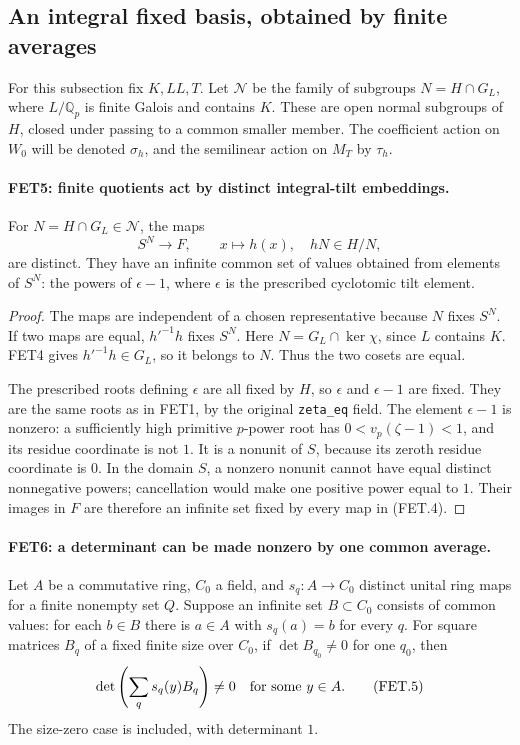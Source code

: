 \subsection{An integral fixed basis, obtained by finite averages}

For this subsection fix $K,LL,T$. Let $\mathcal N$ be the family
of subgroups $N=H\cap G_L$, where $L/\mathbb Q_p$ is finite
Galois and contains $K$. These are open normal subgroups of $H$,
closed under passing to a common smaller member. The coefficient
action on $W_0$ will be denoted $\sigma_h$, and the semilinear
action on $M_T$ by $\tau_h$.

\paragraph{FET5: finite quotients act by distinct integral-tilt embeddings.}
\label{claim:FET5}
For $N=H\cap G_L\in\mathcal N$, the maps
\[
 S^N\longrightarrow F,\qquad x\longmapsto h(x),
                   \quad hN\in H/N,                      \tag{FET.4}
\]
are distinct. They have an infinite common set of values obtained
from elements of $S^N$: the powers of $\epsilon-1$, where
$\epsilon$ is the prescribed cyclotomic tilt element.

\begin{proof}
The maps are independent of a chosen representative because $N$
fixes $S^N$. If two maps are equal, $h'^{-1}h$ fixes $S^N$.
Here $N=G_L\cap\ker\chi$, since $L$ contains $K$.
FET4 gives $h'^{-1}h\in G_L$, so it belongs to $N$.
Thus the two cosets are equal.

The prescribed roots defining $\epsilon$ are all fixed by $H$,
so $\epsilon$ and $\epsilon-1$ are fixed. They are the same roots
as in FET1, by the original \texttt{zeta\_eq} field.
The element $\epsilon-1$ is nonzero: a sufficiently high primitive
$p$-power root has $0<v_p(\zeta-1)<1$, and its residue coordinate
is not $1$. It is a nonunit of $S$, because its zeroth residue
coordinate is $0$. In the domain $S$, a nonzero nonunit cannot
have equal distinct nonnegative powers; cancellation would make
one positive power equal to $1$. Their images in $F$ are therefore
an infinite set fixed by every map in (FET.4).
\end{proof}

\paragraph{FET6: a determinant can be made nonzero by one common average.}
\label{claim:FET6}
Let $A$ be a commutative ring, $C_0$ a field, and
$s_q:A\to C_0$ distinct unital ring maps for a finite nonempty
set $Q$. Suppose an infinite set $B\subset C_0$ consists of
common values: for each $b\in B$ there is $a\in A$ with
$s_q(a)=b$ for every $q$. For square matrices $B_q$ of a fixed
finite size over $C_0$, if $\det B_{q_0}\ne0$ for one $q_0$,
then
\[
              \det\left(\sum_q s_q(y)B_q\right)\ne0
                   \quad\hbox{for some }y\in A.           \tag{FET.5}
\]
The size-zero case is included, with determinant $1$.

